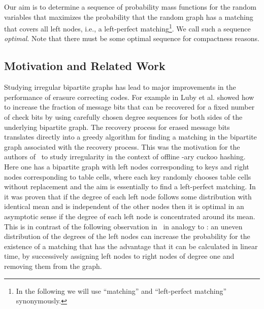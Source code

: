 \let\accentvec\vec \documentclass{llncs}
\begin{document}
Our aim is to determine a sequence of probability mass functions  for the random variables 
that maximizes the probability that the random graph 
has a matching that covers all left nodes, i.e., a left-perfect matching\footnote{In the following we will use ``matching'' and ``left-perfect matching'' synonymously.}.
We call such a sequence \emph{optimal}. Note that there must be some optimal sequence for compactness reasons.



\subsection{Motivation and Related Work}
Studying irregular bipartite graphs has lead to major improvements 
in the performance of erasure correcting codes.
For example in \cite{LMSS_Tornado_2001} Luby et al. showed how to increase the
fraction of message bits that can be recovered 
for a fixed number of check bits by using carefully
chosen degree sequences for both sides of the underlying bipartite graph.
The recovery process for erased message bits 
translates directly into a greedy algorithm 
for finding a matching in the bipartite graph associated with the recovery process.
This was the motivation for the authors of~\cite{DGMMPR_tight_2009_full,DGMMPR_tight_2010}
to study irregularity in the context of offline -ary cuckoo hashing.
Here one has a bipartite graph with left nodes corresponding to
keys and right nodes corresponding to table cells,
where each key randomly chooses table cells without replacement and 
the aim is essentially to find a left-perfect matching.
In \cite{DGMMPR_tight_2009_full} it was proven that if the degree of each left node 
follows some distribution with identical mean
and is independent of the other nodes then 
it is optimal in an asymptotic sense if
the degree of each left node is concentrated around its mean.
This is in contrast of the following observation 
in~\cite{R_mixed_preparation} in analogy to \cite{LMSS_Tornado_2001}:
an uneven distribution of the degrees of the left nodes
can increase the probability for the existence of a matching that has the advantage that it can be calculated
in linear time, by successively assigning left nodes to right nodes of degree one and removing them from the graph.
\end{document}
